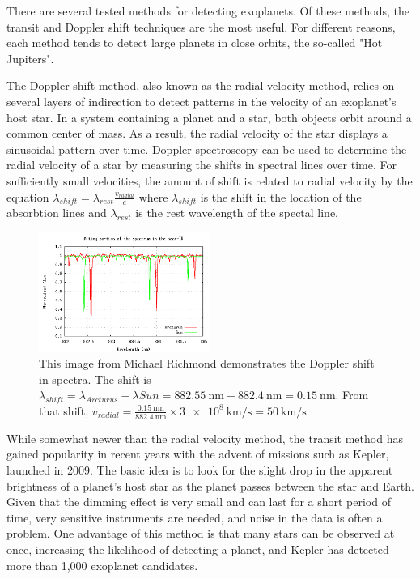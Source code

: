 There are several tested methods for detecting exoplanets. Of these methods, the transit and Doppler
shift techniques are the most useful. For different reasons, each method tends to detect large planets
in close orbits, the so-called "Hot Jupiters". \autocite{hotJupiter}

The Doppler shift method, also known as the radial velocity method, relies on several layers of indirection
to detect patterns in the velocity of an exoplanet's host star. In a system containing a planet and a star,
both objects orbit around a common center of mass.\autocite{jplMethods} As a result, the radial velocity
of the star displays a sinusoidal pattern over time. Doppler spectroscopy can be used to determine the radial
velocity of a star by measuring the shifts in spectral lines over time. For sufficiently small velocities,
the amount of shift is related to radial velocity by the equation
\( \lambda_{shift} = \lambda_{rest} \frac{v_{radial}}{c} \)
where \(\lambda_{shift}\) is the shift in the location of the absorbtion lines and
\(\lambda_{rest}\) is the rest wavelength of the spectal line.\autocite{dopplerSpectroscopy}

\begin{figure}[H]
	\centering
	\includegraphics[width=0.5\textwidth]{images/spec_sun_arcturus}
	\caption{This image from Michael Richmond demonstrates the Doppler shift in spectra. \autocite{dopplerSpectroscopy}
	The shift is \( \lambda_{shift} = \lambda_{Arcturus} - \lambda{Sun} = \SI{882.55}{\nano\meter} - \SI{882.4}{\nano\meter} =  \SI{0.15}{\nano\meter}\).
	From that shift, \( v_{radial} = \frac{ \SI{0.15}{\nano\meter} }{ \SI{882.4}{\nano\meter} } \times \SI{3e8}{\kilo\meter\per\second} = \SI{50}{\kilo\meter\per\second} \)}
\end{figure}

While somewhat newer than the radial velocity method, the transit method has gained popularity in recent years
with the advent of missions such as Kepler, launched in 2009. The basic idea is to look for the slight drop
in the apparent brightness of a planet's host star as the planet passes between the star and Earth. Given that the
dimming effect is very small and can last for a short period of time, very sensitive instruments are needed,
and noise in the data is often a problem.\autocite{jplMethods} One advantage of this method is that
many stars can be observed at once, increasing the likelihood of detecting a planet, and Kepler
has detected more than 1,000 exoplanet candidates.\autocite{jplMethods}

